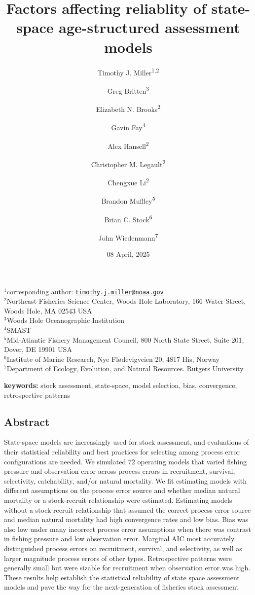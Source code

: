 \documentclass[
  12pt,
]{article}
\title{Factors affecting reliablity of state-space age-structured
assessment models}
\author{Timothy J. Miller\textsuperscript{1,2} \and Greg
Britten\textsuperscript{3} \and Elizabeth N.
Brooks\textsuperscript{2} \and Gavin Fay\textsuperscript{4} \and Alex
Hansell\textsuperscript{2} \and Christopher M.
Legault\textsuperscript{2} \and Chengxue
Li\textsuperscript{2} \and Brandon Muffley\textsuperscript{5} \and Brian
C. Stock\textsuperscript{6} \and John Wiedenmann\textsuperscript{7}}
\date{08 April, 2025}
\begin{document}
\maketitle

\(^1\)corresponding author:
\href{mailto:timothy.j.miller@noaa.gov}{\nolinkurl{timothy.j.miller@noaa.gov}}\\
\(^2\)Northeast Fisheries Science Center, Woods Hole Laboratory, 166
Water Street, Woods Hole, MA 02543 USA\\
\(^3\)Woods Hole Oceanographic Institution\\
\(^4\)SMAST\\
\(^5\)Mid-Atlantic Fishery Management Council, 800 North State Street,
Suite 201, Dover, DE 19901 USA\\
\(^6\)Institute of Marine Research, Nye Flødevigveien 20, 4817 His,
Norway\\
\(^7\)Department of Ecology, Evolution, and Natural Resources. Rutgers
University\\

\pagebreak

\textbf{keywords:} stock assessment, state-space, model selection, bias,
convergence, retrospective patterns

\hypertarget{abstract}{%
\subsection*{Abstract}\label{abstract}}

State-space models are increasingly used for stock assessment, and
evaluations of their statistical reliability and best practices for
selecting among process error configurations are needed. We simulated 72
operating models that varied fishing pressure and observation error
across process errors in recruitment, survival, selectivity,
catchability, and/or natural mortality. We fit estimating models with
different assumptions on the process error source and whether median
natural mortality or a stock-recruit relationship were estimated.
Estimating models without a stock-recruit relationship that assumed the
correct process error source and median natural mortality had high
convergence rates and low bias. Bias was also low under many incorrect
process error assumptions when there was contrast in fishing pressure
and low observation error. Marginal AIC most accurately distinguished
process errors on recruitment, survival, and selectivity, as well as
larger magnitude process errors of other types. Retrospective patterns
were generally small but were sizable for recruitment when observation
error was high. These results help establish the statistical reliability
of state space assessment models and pave the way for the
next-generation of fisheries stock assessment
\end{document}
